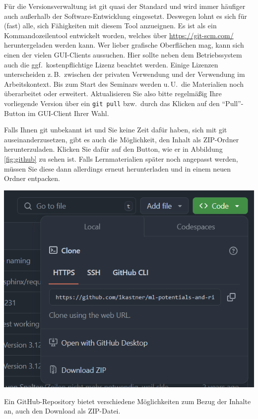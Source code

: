 \documentclass[nobib]{tufte-handout}
\begin{document}
Für die Versionsverwaltung ist git quasi der Standard und wird immer häufiger auch außerhalb der Software-Entwicklung eingesetzt.
Deswegen lohnt es sich für (fast) alle, sich Fähigkeiten mit diesem Tool anzueignen.
Es ist als ein Kommandozeilentool entwickelt worden, welches über
\url{https://git-scm.com/}
heruntergeladen werden kann.
Wer lieber grafische Oberflächen mag, kann sich einen der vielen GUI-Clients%
aussuchen.
Hier sollte neben dem Betriebssystem auch die ggf.\ kostenpflichtige Lizenz beachtet werden.
Einige Lizenzen unterscheiden z.\,B.\ zwischen der privaten Verwendung und der Verwendung im Arbeitskontext.
Bis zum Start des Seminars werden u.\,U.\ die Materialien noch überarbeitet oder erweitert.
Aktualisieren Sie also bitte regelmäßig Ihre vorliegende Version über ein \texttt{git pull} bzw.\ durch das Klicken auf den \enquote{Pull}-Button im GUI-Client Ihrer Wahl.

Falls Ihnen git unbekannt ist und Sie keine Zeit dafür haben, sich mit git auseinanderzusetzen, gibt es auch die Möglichkeit, den Inhalt als ZIP-Ordner herunterzuladen.
Klicken Sie dafür auf den Button, wie er in Abbildung\,\ref{fig:github} zu sehen ist.
Falls Lernmaterialien später noch angepasst werden, müssen Sie diese dann allerdings erneut herunterladen und in einem neuen Ordner entpacken.

\begin{marginfigure}
  \includegraphics{github-zip}
  \caption{Ein GitHub-Repository bietet verschiedene Möglichkeiten zum Bezug der Inhalte an, auch den Download als ZIP-Datei.}%
\label{fig:github}
\end{marginfigure}
\end{document}
